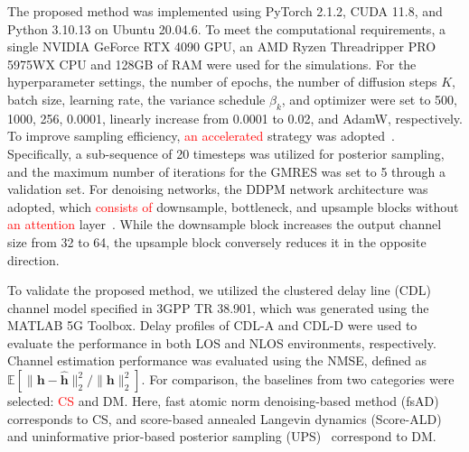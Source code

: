 \documentclass[lettersize,journal]{IEEEtran}
\newcommand{\tred}{\textcolor{red}}
\begin{document}
The proposed method was implemented using PyTorch 2.1.2, CUDA 11.8, and Python 3.10.13 on Ubuntu 20.04.6. To meet the computational requirements, a single NVIDIA GeForce RTX 4090 GPU, an AMD Ryzen Threadripper PRO 5975WX CPU and 128GB of RAM were used for the simulations. For the hyperparameter settings, the number of epochs, the number of diffusion steps $K$, batch size, learning rate, the variance schedule $\beta_{k}$, and optimizer were set to 500, 1000, 256, 0.0001, linearly increase from 0.0001 to 0.02, and AdamW, respectively.
To improve sampling efficiency, \tred{an accelerated} strategy was adopted~\cite{songDenoisingDiffusionImplicit2020}. Specifically, a sub-sequence of 20 timesteps was utilized for posterior sampling, and the maximum number of iterations for the GMRES was set to 5 through a validation set. For denoising networks, the DDPM network architecture was adopted, which \tred{consists of} downsample, bottleneck, and upsample blocks without \tred{an attention} layer~\cite{hoDenoisingDiffusionProbabilistic2020}. While the downsample block increases the output channel size from 32 to 64, the upsample block conversely reduces it in the opposite direction.

To validate the proposed method, we utilized the clustered delay line (CDL) channel model specified in 3GPP TR 38.901, which was generated using the MATLAB 5G Toolbox. Delay profiles of CDL-A and CDL-D were used to evaluate the performance in both LOS and NLOS environments, respectively. Channel estimation performance was evaluated using the NMSE, defined as $\mathbb{E}[\|\mathbf{h}-\hat{\mathbf{h}}\|_{2}^{2} / \|\mathbf{h}\|_{2}^{2}]$. For comparison, the baselines from two categories were selected: \tred{CS} and DM. Here, fast atomic norm denoising-based method (fsAD)~\cite{zhangAtomicNormDenoisingBased2018} corresponds to CS, and score-based annealed Langevin dynamics (Score-ALD)~\cite{arvinteMIMOChannelEstimation2023} and uninformative prior-based posterior sampling (UPS)~\cite{zhouGenerativeDiffusionModels2025} correspond to DM.

\end{document}
